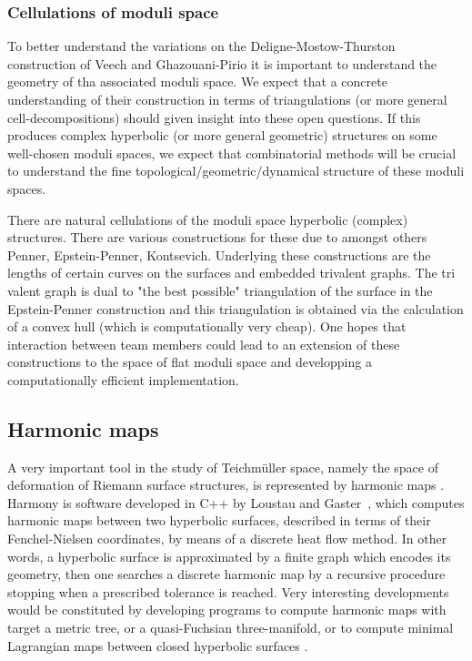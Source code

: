 \documentclass[14pt,fleqn]{article}
\begin{document}
\subsubsection{Cellulations of moduli space}

To better understand the variations 
on the Deligne-Mostow-Thurston construction
of  Veech and Ghazouani-Pirio
it is important to understand the geometry
of tha associated moduli space.
We expect that a concrete understanding of their construction in terms of triangulations (or more general cell-decompositions) should given
insight into these open questions. 
If this produces complex hyperbolic
(or more general geometric) structures on some well-chosen moduli spaces, we expect that combinatorial methods will be crucial to understand the fine topological/geometric/dynamical structure of these
moduli spaces.

There are  natural cellulations of 
the moduli space hyperbolic (complex)  structures.
There are various constructions for these
due to amongst others Penner, Epstein-Penner,  Kontsevich.
Underlying these constructions 
are the lengths of certain curves on the surfaces
and embedded trivalent graphs.
The tri valent graph is dual to 
"the best possible" triangulation of the surface
in the Epstein-Penner construction
and this triangulation is obtained 
via the calculation of a convex hull
(which is computationally very cheap).
One hopes that interaction between team members
could lead to an extension of these constructions
to the space of flat moduli space 
and developping a computationally efficient
implementation.
 


\subsection{Harmonic maps}

A very important tool in the study of Teichm\" {u}ller space, namely the
space of deformation of Riemann surface structures, is represented by
harmonic maps \cite{wolf}. Harmony is  software developed in C++ by
Loustau and Gaster~\cite{glm-cdehm-18}, which computes harmonic maps between two
hyperbolic surfaces, described in terms of their Fenchel-Nielsen
coordinates, by means of a discrete heat flow method. In other words,
a hyperbolic surface is 
approximated by a finite graph 
which encodes its geometry, 
then one searches a discrete harmonic 
map by a  recursive procedure 
stopping when  a prescribed tolerance is reached. 
Very interesting developments would be
constituted by developing programs to compute harmonic maps with
target a metric tree, or a quasi-Fuchsian three-manifold, or to
compute minimal Lagrangian maps between closed hyperbolic surfaces \cite{BS}.
\end{document}
